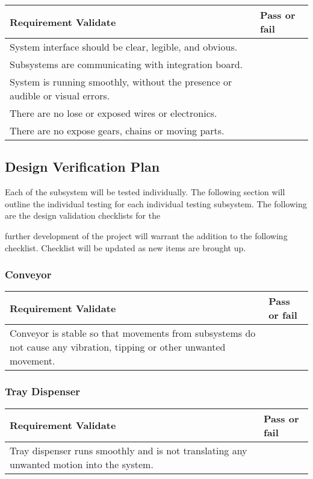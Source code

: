 \documentclass[12pt, titlepage]{article}
\begin{document}
\begin{center}
  \begin{tabular}{ |m{10cm}|m{3cm}| } 
    \hline
    \textbf{Requirement Validate} & \textbf{Pass or fail } \\ 
    \hline
    System interface should be clear, legible, and obvious. & \\
    Subsystems are communicating with integration board.  & \\
    System is running smoothly, without the presence or audible or visual errors.& \\
    There are no lose or exposed wires or electronics.& \\
    There are no expose gears, chains or moving parts.& \\
    
    \hline
  \end{tabular}
\end{center}


\subsection{Design Verification Plan}
Each of the subsystem will be tested individually. The following section will outline the individual testing
 for each individual testing subsystem. The following are the design validation checklists for the 

 further development of the project will warrant the addition to the following checklist. Checklist will be updated as new items are brought up.

 \subsubsection{Conveyor}
 \begin{center}
  \begin{tabular}{ |m{10cm}|m{3cm}| } 
    \hline
    \textbf{Requirement Validate} & \textbf{Pass or fail } \\ 
    \hline
    Conveyor is stable so that movements from subsystems do not cause any vibration, tipping or other unwanted movement. & \\

    \hline
  \end{tabular}
\end{center}

\subsubsection{Tray Dispenser}
\begin{center}
 \begin{tabular}{ |m{10cm}|m{3.2cm}| } 
   \hline
   \textbf{Requirement Validate} & \textbf{Pass or fail } \\ 
   \hline
   Tray dispenser runs smoothly and is not translating any unwanted motion into the system. & \\

   \hline
 \end{tabular}
\end{center}
\end{document}
